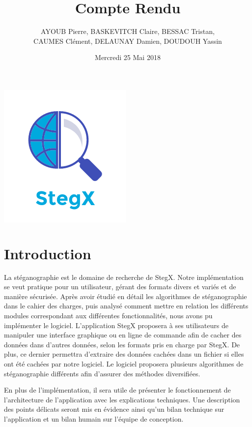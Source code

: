 \documentclass[11pt]{article}
\title{\huge{\textbf Compte Rendu}}
\author{AYOUB Pierre, BASKEVITCH Claire, BESSAC Tristan, \\
CAUMES Clément, DELAUNAY Damien, DOUDOUH Yassin}
\date{Mercredi 25 Mai 2018}
\begin{document}
\maketitle
\vspace{20em}
\begin{center}\includegraphics{pictures/Application.png}\end{center}
\newpage

\tableofcontents

\newpage

\section{Introduction}

La stéganographie est le domaine de recherche de StegX. Notre implémentation se
veut pratique pour un utilisateur, gérant des formats divers et variés et de
manière sécurisée.
Après avoir étudié en détail les algorithmes de stéganographie dans le cahier
des charges, puis analysé comment mettre en relation les différents modules
correspondant aux différentes fonctionnalités, nous avons pu implémenter le
logiciel.
L'application StegX proposera à ses utilisateurs de manipuler une interface
graphique ou en ligne de commande afin de cacher des données dans d'autres
données, selon les formats pris en charge par StegX. De plus, ce dernier
permettra d'extraire des données cachées dans un fichier si elles ont été
cachées par notre logiciel. Le logiciel proposera plusieurs algorithmes de
stéganographie différents afin d'assurer des méthodes diversifiées. 

En plus de l'implémentation, il sera utile de présenter le fonctionnement de
l'architecture de l'application avec les explications techniques. Une
description des points délicats seront mis en évidence ainsi qu'un bilan
technique sur l'application et un bilan humain sur l'équipe de conception. 
\end{document}
